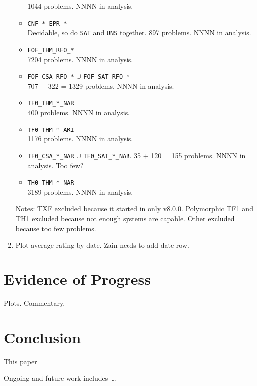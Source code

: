 \documentclass[runningheads]{llncs}
\begin{document}
\begin{enumerate}
\begin{itemize}
            1044 problems. NNNN in analysis.
      \item {\tt CNF\_*\_EPR\_*} \\ 
            Decidable, so do {\tt SAT} and {\tt UNS} together.
            897 problems. NNNN in analysis.
      \item {\tt FOF\_THM\_RFO\_*} \\
            7204 problems. NNNN in analysis.
      \item {\tt FOF\_CSA\_RFO\_*} $\cup$ {\tt FOF\_SAT\_RFO\_*} \\
            707 + 322 = 1329 problems. NNNN in analysis.
      \item {\tt TF0\_THM\_*\_NAR} \\
            400 problems. NNNN in analysis.
      \item {\tt TF0\_THM\_*\_ARI} \\
            1176 problems. NNNN in analysis.
      \item {\tt TF0\_CSA\_*\_NAR} $\cup$ {\tt TF0\_SAT\_*\_NAR}. 
            35 + 120 = 155 problems. NNNN in analysis.
            Too few?
      \item {\tt TH0\_THM\_*\_NAR} \\
            3189 problems. NNNN in analysis.
      \end{itemize}
      Notes: TXF excluded because it started in only v8.0.0.
      Polymorphic TF1 and TH1 excluded because not enough systems are capable.
      Other excluded because too few problems.
\item Plot average rating by date.
      Zain needs to add date row.
\end{enumerate}

\section{Evidence of Progress}
\label{Evidence}

Plots.
Commentary.

\section{Conclusion}
\label{Conclusion}

This paper 

Ongoing and future work includes~\ldots



\end{document}
